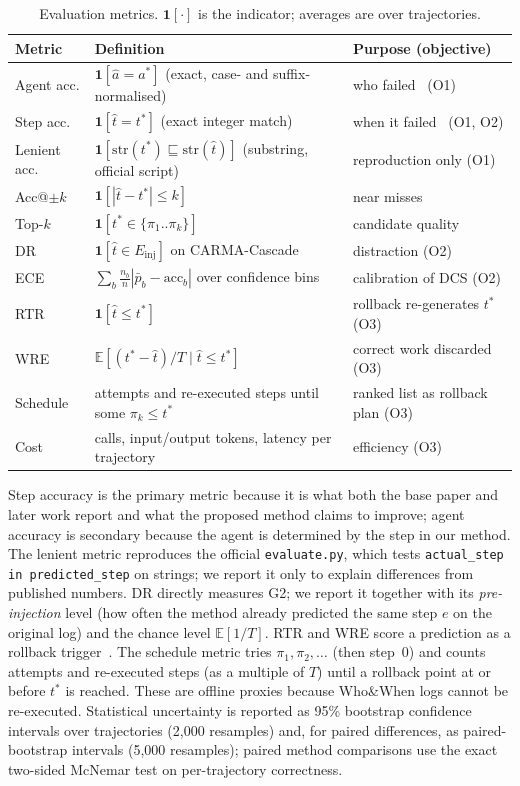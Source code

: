 \documentclass[conference]{IEEEtran}
\begin{document}
\begin{table}[t]
\centering
\caption{Evaluation metrics. $\mathbf{1}[\cdot]$ is the indicator; averages are over trajectories.}
\label{tab:metrics}
\footnotesize
\setlength{\tabcolsep}{2.5pt}
\begin{tabular}{@{}p{1.35cm}p{3.6cm}p{2.9cm}@{}}
\toprule
Metric & Definition & Purpose (objective) \\
\midrule
Agent acc. & $\mathbf{1}[\hat a=a^*]$ (exact, case- and suffix-normalised) & who failed~\cite{zhang2025whowhen} (O1) \\
Step acc. & $\mathbf{1}[\hat t=t^*]$ (exact integer match) & when it failed~\cite{zhang2025whowhen} (O1, O2) \\
Lenient acc. & $\mathbf{1}[\mathrm{str}(t^*)\sqsubseteq\mathrm{str}(\hat t)]$ (substring, official script) & reproduction only (O1) \\
Acc@$\pm k$ & $\mathbf{1}[|\hat t-t^*|\le k]$ & near misses~\cite{zhang2025whowhen} \\
Top-$k$ & $\mathbf{1}[t^*\in\{\pi_1..\pi_k\}]$ & candidate quality~\cite{feng2026conformal} \\
DR & $\mathbf{1}[\hat t\in E_{\text{inj}}]$ on CARMA-Cascade & distraction (O2) \\
ECE & $\sum_b \frac{n_b}{n}|\bar p_b-\mathrm{acc}_b|$ over confidence bins & calibration of DCS (O2) \\
RTR & $\mathbf{1}[\hat t\le t^*]$ & rollback re-generates $t^*$ (O3) \\
WRE & $\mathbb{E}[(t^*-\hat t)/T\mid\hat t\le t^*]$ & correct work discarded (O3) \\
Schedule & attempts and re-executed steps until some $\pi_k\le t^*$ & ranked list as rollback plan (O3) \\
Cost & calls, input/output tokens, latency per trajectory & efficiency (O3) \\
\bottomrule
\end{tabular}
\end{table}

Step accuracy is the primary metric because it is what both the base paper and later work report and what the proposed method claims to improve; agent accuracy is secondary because the agent is determined by the step in our method. The lenient metric reproduces the official \texttt{evaluate.py}, which tests \texttt{actual\_step in predicted\_step} on strings; we report it only to explain differences from published numbers. DR directly measures G2; we report it together with its \emph{pre-injection} level (how often the method already predicted the same step $e$ on the original log) and the chance level $\mathbb{E}[1/T]$. RTR and WRE score a prediction as a rollback trigger~\cite{ma2025dover,feng2026conformal}. The schedule metric tries $\pi_1,\pi_2,\dots$ (then step~0) and counts attempts and re-executed steps (as a multiple of $T$) until a rollback point at or before $t^*$ is reached. These are offline proxies because Who\&When logs cannot be re-executed. Statistical uncertainty is reported as 95\% bootstrap confidence intervals over trajectories (2,000 resamples) and, for paired differences, as paired-bootstrap intervals (5,000 resamples); paired method comparisons use the exact two-sided McNemar test on per-trajectory correctness.
\end{document}
